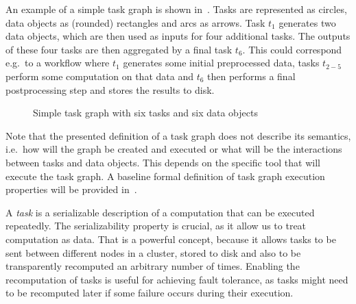 An example of a simple task graph is shown in~. Tasks are represented as
circles, data objects as (rounded) rectangles and arcs as arrows. Task $t_1$
generates two data objects, which are then used as inputs for four additional tasks. The outputs of
these four tasks are then aggregated by a final task $t_6$. This could correspond
e.g.\ to a workflow where $t_1$ generates some initial preprocessed data, tasks $t_{2-5}$
perform some computation on that data and $t_6$ then performs a final postprocessing
step and stores the results to disk.

\begin{figure}[h]
	\centering
	\caption{Simple task graph with six tasks and six data objects}
	\label{fig:task-graph-example}
\end{figure}

Note that the presented definition of a task graph does not describe its semantics, i.e.\ how
will the graph be created and executed or what will be the interactions between tasks and data
objects. This depends on the specific tool that will execute the task graph. A baseline formal
definition of task graph execution properties will be provided
in~.

A \emph{task} is a serializable description of a computation that can be executed
repeatedly. The serializability property is crucial, as it allow us to treat computation as data.
That is a powerful concept, because it allows tasks to be sent between different nodes in a
cluster, stored to disk and also to be transparently recomputed an arbitrary number of times.
Enabling the
recomputation of tasks is useful for achieving fault tolerance, as tasks might need to be
recomputed later if some failure occurs during their execution.

